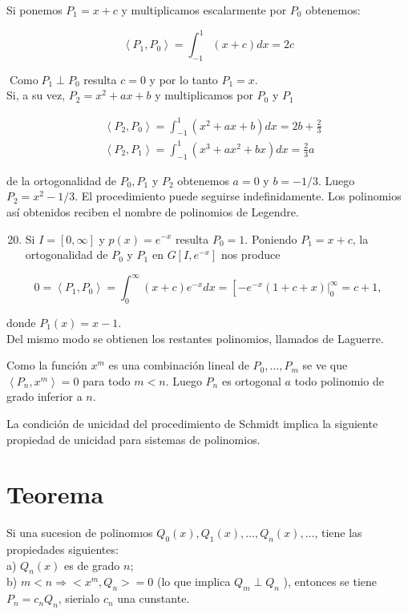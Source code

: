 \documentclass[10pt]{article}
\theoremstyle{plain}
\theoremstyle{definition}
\theoremstyle{remark}
\begin{document}
Si ponemos $P_{1}=x+c$ y multiplicamos escalarmente por $P_{0}$ obtenemos:

$$
\left\langle P_{1}, P_{0}\right\rangle=\int_{-1}^{1}(x+c) d x=2 c
$$

$\operatorname{Como} P_{1} \perp P_{0}$ resulta $c=0$ y por lo tanto $P_{1}=x$.\\
Si, a su vez, $P_{2}=x^{2}+a x+b$ y multiplicamos por $P_{0}$ y $P_{1}$

$$
\begin{aligned}
& \left\langle P_{2}, P_{0}\right\rangle=\int_{-1}^{1}\left(x^{2}+a x+b\right) d x=2 b+\frac{2}{3} \\
& \left\langle P_{2}, P_{1}\right\rangle=\int_{-1}^{1}\left(x^{3}+a x^{2}+b x\right) d x=\frac{2}{3} a
\end{aligned}
$$

de la ortogonalidad de $P_{0}, P_{1}$ y $P_{2}$ obtenemos $a=0$ y $b=-1 / 3$. Luego $P_{2}=x^{2}-1 / 3$. El procedimiento puede seguirse indefinidamente. Los polinomios así obtenidos reciben el nombre de polinomios de Legendre.


\begin{enumerate}
  \setcounter{enumi}{19}
  \item Si $I=[0, \infty]$ y $p(x)=e^{-x}$ resulta $P_{0}=1$. Poniendo $P_{1}=x+c$, la ortogonalidad de $P_{0}$ y $P_{1}$ en $G\left[I, e^{-x}\right]$ nos produce
\end{enumerate}

$$
0=\left\langle P_{1}, P_{0}\right\rangle=\int_{0}^{\infty}(x+c) e^{-x} d x=\left[-\left.e^{-x}(1+c+x)\right|_{0} ^{\infty}=c+1,\right.
$$

donde $P_{1}(x)=x-1$.\\
Del mismo modo se obtienen los restantes polinomios, llamados de Laguerre.

Como la función $x^{m}$ es una combinación lineal de $P_{0}, \ldots, P_{m}$ se ve que $\left\langle P_{n}, x^{m}\right\rangle=0$ para todo $m<n$. Luego $P_{n}$ es ortogonal $a$ todo polinomio de grado inferior a $n$.

La condición de unicidad del procedimiento de Schmidt implica la siguiente propiedad de unicidad para sistemas de polinomios.

\section*{Teorema}
Si una sucesion de polinomıos $Q_{0}(x), Q_{1}(x), \ldots, Q_{n}(x), \ldots$, tiene las propiedades siguientes:\\
a) $Q_{n}(x)$ es de grado $n$;\\
b) $m<n \Rightarrow<x^{m}, Q_{n}>=0$ (lo que implica $Q_{m} \perp Q_{n}$ ), entonces se tiene $P_{n}=c_{n} Q_{n}$, sierialo $c_{n}$ una cunstante.
\end{document}
